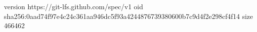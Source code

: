 version https://git-lfs.github.com/spec/v1
oid sha256:0aad74f97e4c24c361aa946dc5f93a4244876739380600b7c9d4f2e298cf4f14
size 466462
